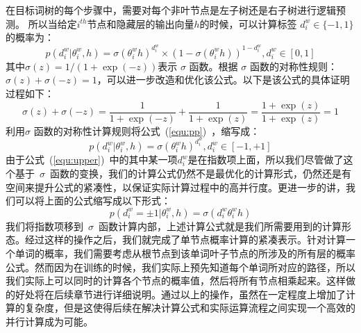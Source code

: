 在目标词树的每个步骤中，需要对每个非叶节点是左子树还是右子树进行逻辑预测。 所以当给定$ i^{th} $节点和隐藏层的输出向量$h$的时候，可以计算标签 $d^w_i\in \{-1,1\}$的概率为：
 \begin{equation}\label{equ:pp}
 p(d^w_i|\theta_{i}^w,h) =\sigma(\theta_{i}^w h)^{d_i^w}\times(1-\sigma(\theta_{i}^w h))^{1-{d_i^w}},d_i^w \in [0,1]
\end{equation}
其中$ \sigma(z)= 1 /(1 + \exp(-z))$表示 $\sigma$ 函数。根据 $\sigma$ 函数的对称性规则：$\sigma(z)+ \sigma(-z)=1$，可以进一步改造和优化该公式。以下是该公式的具体证明过程如下：
\begin{equation}\label{equ:sig}
\sigma(z)+ \sigma(-z)  =\frac{1}{1 + \exp(-z)}+\frac{1}{1 + \exp(z)}=\frac{1 + \exp(z)}{1 + \exp(z)}=1
\end{equation}
利用$\sigma$ 函数的对称性计算规则将公式~(\ref{equ:pp})~，缩写成：
 \begin{equation}\label{equ:upper}
p(d^w_i|\theta_{i}^w,h) =\sigma(\theta_{i}^w h)^{d_i^w}, d_i^w \in [-1,+1]
\end{equation}
由于公式~(\ref{equ:upper})~中的其中某一项${d_i^w}$是在指数项上面，所以我们尽管做了这个基于~$\sigma$~函数的变换，我们的计算公式仍然不是最优化的计算形式，仍然还是有空间来提升公式的紧凑性，以保证实际计算过程中的高并行度。更进一步的讲，我们可以将上面的公式缩写成以下形式：
\begin{equation}
p(d^w_i=\pm 1|\theta_{i}^w,h) = \sigma({d_i^w}\theta_{i}^w h)
\end{equation}
我们将指数项移到~$\sigma$~函数计算内部，上述计算公式就是我们所需要用到的计算形态。经过这样的操作之后，我们就完成了单节点概率计算的紧凑表示。针对计算一个单词的概率，我们需要考虑从根节点到该单词叶子节点的所涉及的所有层的概率公式。然而因为在训练的时候，我们实际上预先知道每个单词所对应的路径，所以我们实际上可以同时的计算各个节点的概率值，然后将所有节点相乘起来。这样做的好处将在后续章节进行详细说明。通过以上的操作，虽然在一定程度上增加了计算的复杂度，但是这使得后续在解决计算公式和实际运算流程之间实现一个高效的并行计算成为可能。

